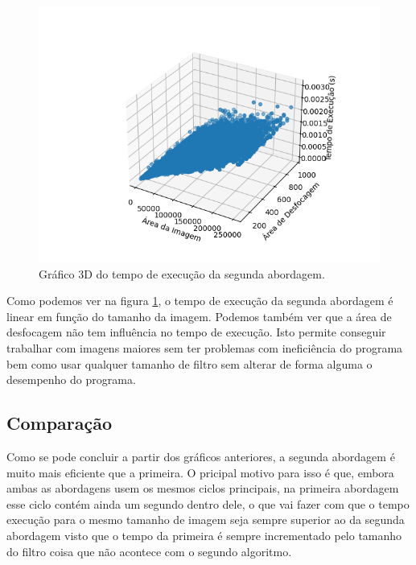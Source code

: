 \begin{figure}[H]
    \centering
    \includegraphics[width=\linewidth]{images/second-3d_plot.png}
    \caption{Gráfico 3D do tempo de execução da segunda abordagem.}
    \label{fig:imageblur/second-3d_plot}
\end{figure}

Como podemos ver na figura \ref{fig:imageblur/second-3d_plot}, o tempo de execução da segunda abordagem é linear em função do tamanho da imagem. Podemos também ver que a área de desfocagem não tem influência no tempo de execução. Isto permite conseguir trabalhar com imagens maiores sem ter problemas com ineficiência do programa bem como usar qualquer tamanho de filtro sem alterar de forma alguma o desempenho do programa.

\subsection{Comparação}

Como se pode concluir a partir dos gráficos anteriores, a segunda abordagem é muito mais eficiente que a primeira. O pricipal motivo para isso é que, embora ambas as abordagens usem os mesmos ciclos principais, na primeira abordagem esse ciclo contém ainda um segundo dentro dele, o que vai fazer com que o tempo execução para o mesmo tamanho de imagem seja sempre superior ao da segunda abordagem visto que o tempo da primeira é sempre incrementado pelo tamanho do filtro coisa que não acontece com o segundo algoritmo.

